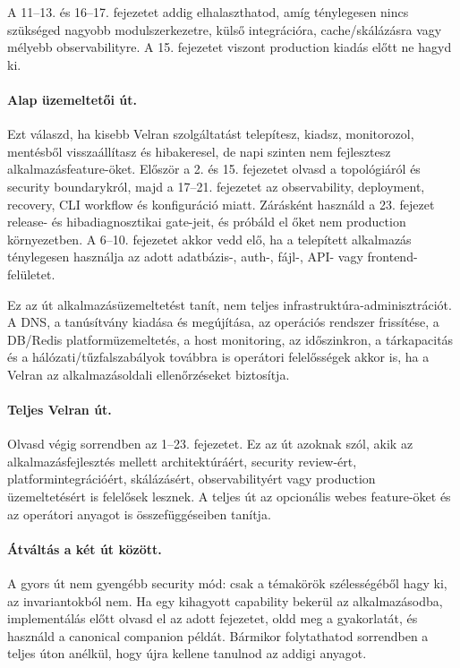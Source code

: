 A 11--13. és 16--17. fejezetet addig elhalaszthatod, amíg ténylegesen nincs szükséged nagyobb modulszerkezetre, külső integrációra, cache/skálázásra vagy mélyebb observabilityre. A 15. fejezetet viszont production kiadás előtt ne hagyd ki.

\paragraph{Alap üzemeltetői út.}
Ezt válaszd, ha kisebb Velran szolgáltatást telepítesz, kiadsz, monitorozol, mentésből visszaállítasz és hibakeresel, de napi szinten nem fejlesztesz alkalmazásfeature-öket. Először a 2. és 15. fejezetet olvasd a topológiáról és security boundarykról, majd a 17--21. fejezetet az observability, deployment, recovery, CLI workflow és konfiguráció miatt. Zárásként használd a 23. fejezet release- és hibadiagnosztikai gate-jeit, és próbáld el őket nem production környezetben. A 6--10. fejezetet akkor vedd elő, ha a telepített alkalmazás ténylegesen használja az adott adatbázis-, auth-, fájl-, API- vagy frontend-felületet.

Ez az út alkalmazásüzemeltetést tanít, nem teljes infrastruktúra-adminisztrációt. A DNS, a tanúsítvány kiadása és megújítása, az operációs rendszer frissítése, a DB/Redis platformüzemeltetés, a host monitoring, az időszinkron, a tárkapacitás és a hálózati/tűzfalszabályok továbbra is operátori felelősségek akkor is, ha a Velran az alkalmazásoldali ellenőrzéseket biztosítja.

\paragraph{Teljes Velran út.}
Olvasd végig sorrendben az 1--23. fejezetet. Ez az út azoknak szól, akik az alkalmazásfejlesztés mellett architektúráért, security review-ért, platformintegrációért, skálázásért, observabilityért vagy production üzemeltetésért is felelősek lesznek. A teljes út az opcionális webes feature-öket és az operátori anyagot is összefüggéseiben tanítja.

\paragraph{Átváltás a két út között.}
A gyors út nem gyengébb security mód: csak a témakörök szélességéből hagy ki, az invariantokból nem. Ha egy kihagyott capability bekerül az alkalmazásodba, implementálás előtt olvasd el az adott fejezetet, oldd meg a gyakorlatát, és használd a canonical companion példát. Bármikor folytathatod sorrendben a teljes úton anélkül, hogy újra kellene tanulnod az addigi anyagot.

